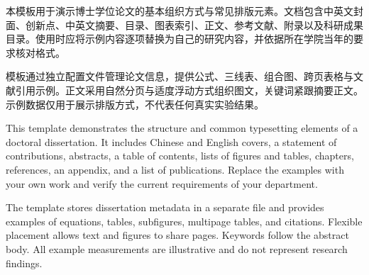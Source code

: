 \begin{cnabstract}
本模板用于演示博士学位论文的基本组织方式与常见排版元素。文档包含中英文封面、创新点、中英文摘要、目录、图表索引、正文、参考文献、附录以及科研成果目录。使用时应将示例内容逐项替换为自己的研究内容，并依据所在学院当年的要求核对格式。

模板通过独立配置文件管理论文信息，提供公式、三线表、组合图、跨页表格与文献引用示例。正文采用自然分页与适度浮动方式组织图文，关键词紧跟摘要正文。示例数据仅用于展示排版方式，不代表任何真实实验结果。

\end{cnabstract}

\begin{enabstract}
This template demonstrates the structure and common typesetting elements of a doctoral dissertation. It includes Chinese and English covers, a statement of contributions, abstracts, a table of contents, lists of figures and tables, chapters, references, an appendix, and a list of publications. Replace the examples with your own work and verify the current requirements of your department.

The template stores dissertation metadata in a separate file and provides examples of equations, tables, subfigures, multipage tables, and citations. Flexible placement allows text and figures to share pages. Keywords follow the abstract body. All example measurements are illustrative and do not represent research findings.

\end{enabstract}
